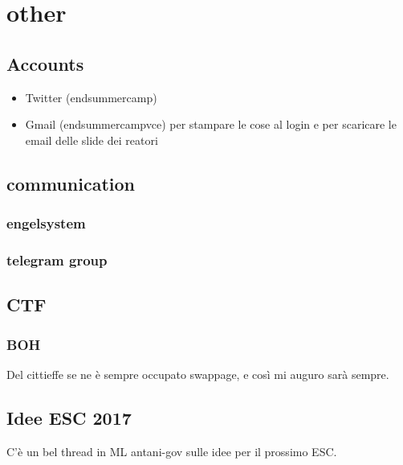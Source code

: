 \chapter{other}


\section{Accounts}

\begin{itemize}
\item Twitter (endsummercamp)
\item Gmail (endsummercampvce) per stampare le cose al login e per scaricare le email delle slide dei reatori
\end{itemize}

\section{communication}


\subsection{engelsystem}

\subsection{telegram group}


\section{CTF}

\subsection{BOH}
Del cittieffe se ne è sempre occupato swappage, e così mi auguro sarà sempre.

\section{Idee ESC 2017}
C'è un bel thread in ML antani-gov sulle idee per il prossimo ESC. 

